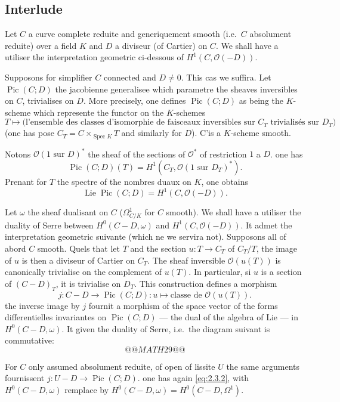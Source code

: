 \documentclass[12pt,a4paper]{article}
\theoremstyle{plain}
\theoremstyle{definition}
\theoremstyle{remark}
\DeclareMathOperator{\Spec}{Spec}
\DeclareMathOperator{\Lie}{Lie}
\DeclareMathOperator{\Pic}{Pic}
\newcommand{\OO}{\mathcal{O}}
\providecommand{\Spec}{\operatorname{Spec}}
\providecommand{\Lie}{\operatorname{Lie}}
\begin{document}
\subsection{Interlude}

Let $C$ a curve complete reduite and generiquement smooth (i.e.\ $C$
absolument reduite) over a field $K$ and $D$ a diviseur (of Cartier) on $C$. We shall have a utiliser the interpretation geometric ci-dessous of $H^1(C,\OO(-D))$.

Supposons for simplifier $C$ connected and $D\neq 0$. This cas we suffira. Let
$\Pic(C;D)$ the jacobienne generalisee which parametre the sheaves inversibles on
$C$, trivialises on $D$. More precisely, one defines $\Pic(C;D)$ as being the $K$-
scheme which represente the functor on the $K$-schemes
\[
T\mapsto\text{(l'ensemble des classes d'isomorphie de faisceaux inversibles sur $C_T$ trivialisés sur $D_T$)}
\]
(one has pose $C_T=C\times_{\Spec K}T$ and similarly for $D$). C'is a $K$-scheme smooth.

Notons $\OO(\text{1 sur }D)^*$ the sheaf of the sections of $\OO^*$ of restriction $1$ a $D$. one has
\[
\Pic(C;D)(T)=H^1(C_T,\OO(\text{1 sur }D_T)^*).
\]
Prenant for $T$ the spectre of the nombres duaux on $K$, one obtains
\begin{equation}\label{eq:2.3.1}
\Lie\Pic(C;D)=H^1(C,\OO(-D)).
\end{equation}

Let $\omega$ the sheaf dualisant on $C$ ($\Omega^1_{C/K}$ for $C$ smooth). We shall have a
utiliser the duality of Serre between $H^0(C-D,\omega)$ and $H^1(C,\OO(-D))$. It admet
the interpretation geometric suivante (which ne we servira not). Supposons all
of abord $C$ smooth. Quels that let $T$ and the section $u:T\to C_T$ of $C_T/T$, the image of
$u$ is then a diviseur of Cartier on $C_T$. The sheaf inversible $\OO(u(T))$ is
canonically trivialise on the complement of $u(T)$. In particular, si $u$ is a
section of $(C-D)_T$, it is trivialise on $D_T$. This construction defines a morphism
\begin{equation}\label{eq:2.3.2}
j:C-D\to\Pic(C;D):u\mapsto\text{classe de }\OO(u(T)).
\end{equation}
the inverse image by $j$ fournit a morphism of the space vector of the forms
differentielles invariantes on $\Pic(C;D)$ --- the dual of the algebra of Lie --- in
$H^0(C-D,\omega)$. It given the duality of Serre, i.e.\ the diagram suivant is
commutative:
\[
@@MATH29@@
\]

For $C$ only assumed absolument reduite, of open of lissite $U$ the
same arguments fournissent $j:U-D\to\Pic(C;D)$. one has again
\eqref{eq:2.3.2}, with $H^0(C-D,\omega)$ remplace by
$H^0(C-D,\omega)=H^0(C-D,\Omega^1)$.
\end{document}
